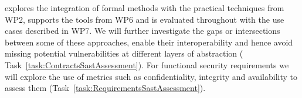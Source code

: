 \begin{Workpackage}{\thewpno}
\begin{WPDescription}
\theWP{} explores the integration of formal methods with the practical techniques from WP2, supports the tools from WP6 and is evaluated throughout with the use cases described in WP7.
We will further investigate the gaps or intersections between some of these approaches, enable their interoperability and hence avoid missing potential vulnerabilities at different layers of abstraction (%
Task~\ref{task:ContractsSastAssessment}). 
For functional security requirements we will explore the use of metrics such as confidentiality, integrity and availability to assess them (Task~\ref{task:RequirementsSastAssessment}).
\end{WPDescription}


\begin{Task}
\TaskResults{%
\ref{del:formal1},
\ref{del:formal2},
\ref{del:formal3}
}
\TaskHeader{}


\end{Task}
\end{Workpackage}
